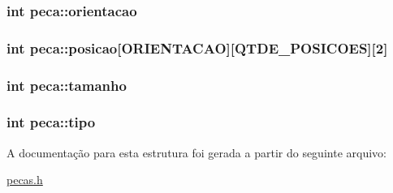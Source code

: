 \subsubsection[{orientacao}]{\setlength{\rightskip}{0pt plus 5cm}int peca\+::orientacao}\label{structpeca_abaea72a99b0c8e6ec7c3863ca79f0d3a}
\hypertarget{structpeca_a4a244e3f32719c0d170c9736bd083568}{}
\subsubsection[{posicao}]{\setlength{\rightskip}{0pt plus 5cm}int peca\+::posicao\mbox{[}{\bf O\+R\+I\+E\+N\+T\+A\+C\+A\+O}\mbox{]}\mbox{[}{\bf Q\+T\+D\+E\+\_\+\+P\+O\+S\+I\+C\+O\+E\+S}\mbox{]}\mbox{[}2\mbox{]}}\label{structpeca_a4a244e3f32719c0d170c9736bd083568}
\hypertarget{structpeca_a98fca9b307508256052040ca10395534}{}
\subsubsection[{tamanho}]{\setlength{\rightskip}{0pt plus 5cm}int peca\+::tamanho}\label{structpeca_a98fca9b307508256052040ca10395534}
\hypertarget{structpeca_a5cfcc69ec4548de975da53ea3e8dd10e}{}
\subsubsection[{tipo}]{\setlength{\rightskip}{0pt plus 5cm}int peca\+::tipo}\label{structpeca_a5cfcc69ec4548de975da53ea3e8dd10e}


A documentação para esta estrutura foi gerada a partir do seguinte arquivo\+:\begin{DoxyCompactItemize}
\item 
\hyperlink{pecas_8h}{pecas.\+h}\end{DoxyCompactItemize}
